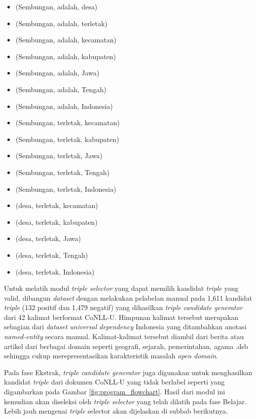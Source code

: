 \begin{itemize}
\item (Sembungan, adalah, desa) 
\item (Sembungan, adalah, terletak)
\item (Sembungan, adalah, kecamatan)
\item (Sembungan, adalah, kabupaten)
\item (Sembungan, adalah, Jawa)
\item (Sembungan, adalah, Tengah)
\item (Sembungan, adalah, Indonesia)
\item (Sembungan, terletak, kecamatan) 
\item (Sembungan, terletak, kabupaten) 
\item (Sembungan, terletak, Jawa) 
\item (Sembungan, terletak, Tengah)
\item (Sembungan, terletak, Indonesia) 
\item (desa, terletak, kecamatan)
\item (desa, terletak, kabupaten)
\item (desa, terletak, Jawa)
\item (desa, terletak, Tengah)
\item (desa, terletak, Indonesia)
\end{itemize}

Untuk melatih modul \textit{triple selector} yang dapat memilih kandidat \textit{triple} yang valid, dibangun \textit{dataset} dengan melakukan pelabelan manual pada 1,611 kandidat \textit{triple} (132 positif dan 1,479 negatif) yang dihasilkan \textit{triple candidate generator} dari 42 kalimat berformat CoNLL-U. Himpunan kalimat tersebut merupakan sebagian dari \textit{dataset} \textit{universal dependency} Indonesia yang ditambahkan anotasi \textit{named-entity} secara manual. Kalimat-kalimat tersebut diambil dari berita atau artikel dari berbagai domain seperti geografi, sejarah, pemerintahan, agama .dsb sehingga cukup merepresentasikan karakteristik masalah \textit{open domain}.

Pada fase Ekstrak, \textit{triple candidate generator} juga digunakan untuk menghasilkan kandidat \textit{triple} dari dokumen CoNLL-U yang tidak berlabel seperti yang digambarkan pada Gambar \ref{fig:program_flowchart}. Hasil dari modul ini kemudian akan diseleksi oleh \textit{triple selector} yang telah dilatih pada fase Belajar. Lebih jauh mengenai \textit{triple} selector akan dijelaskan di subbab berikutnya.

